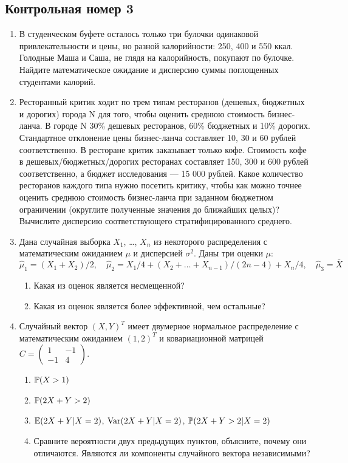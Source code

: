 \documentclass[12pt, a4paper]{article}\usepackage[]{graphicx}\usepackage[]{color}
\begin{document}



\subsection{Контрольная номер 3}

\begin{enumerate}

\item В студенческом буфете осталось только три булочки одинаковой привлекательности и цены, но разной калорийности: 250, 400 и 550 ккал. Голодные Маша и Саша, не глядя на калорийность, покупают по булочке. Найдите математическое ожидание и дисперсию суммы поглощенных студентами калорий.

\item Ресторанный критик ходит по трем типам ресторанов (дешевых, бюджетных и дорогих) города N для того, чтобы оценить среднюю стоимость бизнес-ланча. В городе N 30\% дешевых ресторанов, 60\% бюджетных  и 10\% дорогих. Стандартное отклонение цены бизнес-ланча составляет 10, 30 и 60 рублей соответственно. В ресторане критик заказывает только кофе.  Стоимость кофе в дешевых/бюджетных/дорогих ресторанах составляет 150, 300 и 600 рублей соответственно, а бюджет  исследования — 15 000 рублей. Какое количество ресторанов каждого типа нужно посетить критику, чтобы как можно точнее оценить среднюю стоимость бизнес-ланча при заданном бюджетном ограничении (округлите полученные значения до ближайших целых)? Вычислите дисперсию соответствующего стратифицированного среднего.

\item Дана случайная выборка $X_1$, \ldots, $X_n$  из некоторого распределения с математическим ожиданием $\mu$ и дисперсией $\sigma^2$. Даны три оценки $\mu$:
 \[
\hat\mu_1 = (X_1 + X_2)/2, \quad \hat\mu_2 = X_1/4 + (X_2 + \ldots + X_{n-1})/(2n-4) + X_n/4, \quad \hat\mu_3 = \bar X
 \]
\begin{enumerate}
\item Какая из оценок является несмещенной?
\item Какая из оценок является более эффективной, чем остальные?
\end{enumerate}

\item Случайный вектор $(X, Y)^T$ имеет двумерное нормальное распределение с математическим ожиданием  $(1, 2)^T$ и ковариационной матрицей
$C=\begin{pmatrix}
1 & -1 \\
-1 & 4
\end{pmatrix}$.
\begin{enumerate}
\item $\P(X>1)$
\item $\P(2X+Y>2)$
\item $\E(2X+Y|X=2)$, $\Var(2X+Y|X=2)$, $\P(2X+Y>2|X=2)$
\item Сравните вероятности двух предыдущих пунктов, объясните, почему они отличаются.
Являются ли компоненты случайного вектора независимыми?
\end{enumerate}



\end{enumerate}
\end{document}

